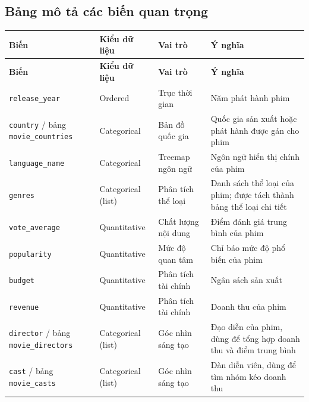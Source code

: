 \subsection{Bảng mô tả các biến quan trọng}
\begin{longtable}{|p{3cm}|p{2.8cm}|p{3cm}|p{5.2cm}|}
\hline
\textbf{Biến} & \textbf{Kiểu dữ liệu} & \textbf{Vai trò} & \textbf{Ý nghĩa} \\
\hline
\endfirsthead
\hline
\textbf{Biến} & \textbf{Kiểu dữ liệu} & \textbf{Vai trò} & \textbf{Ý nghĩa} \\
\hline
\endhead
\texttt{release\_year} & Ordered & Trục thời gian & Năm phát hành phim \\
\hline
\texttt{country} / bảng \texttt{movie\_countries} & Categorical & Bản đồ quốc gia & Quốc gia sản xuất hoặc phát hành được gán cho phim \\
\hline
\texttt{language\_name} & Categorical & Treemap ngôn ngữ & Ngôn ngữ hiển thị chính của phim \\
\hline
\texttt{genres} & Categorical (list) & Phân tích thể loại & Danh sách thể loại của phim; được tách thành bảng thể loại chi tiết \\
\hline
\texttt{vote\_average} & Quantitative & Chất lượng nội dung & Điểm đánh giá trung bình của phim \\
\hline
\texttt{popularity} & Quantitative & Mức độ quan tâm & Chỉ báo mức độ phổ biến của phim \\
\hline
\texttt{budget} & Quantitative & Phân tích tài chính & Ngân sách sản xuất \\
\hline
\texttt{revenue} & Quantitative & Phân tích tài chính & Doanh thu của phim \\
\hline
\texttt{director} / bảng \texttt{movie\_directors} & Categorical (list) & Góc nhìn sáng tạo & Đạo diễn của phim, dùng để tổng hợp doanh thu và điểm trung bình \\
\hline
\texttt{cast} / bảng \texttt{movie\_casts} & Categorical (list) & Góc nhìn sáng tạo & Dàn diễn viên, dùng để tìm nhóm kéo doanh thu \\
\hline
\end{longtable}
